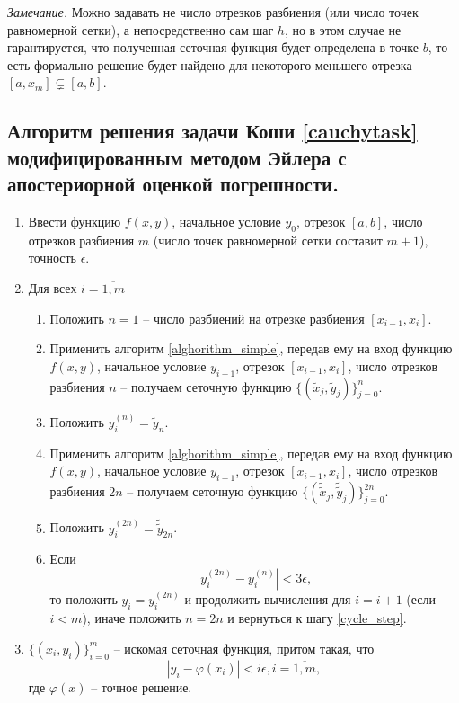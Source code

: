 \documentclass[a4paper, 12pt]{article}
\begin{document}
	\textit{Замечание.} Можно задавать не число отрезков разбиения (или число точек равномерной сетки), а непосредственно сам шаг $h$, но в этом случае не гарантируется, что полученная сеточная функция будет определена в точке $b$, то есть формально решение будет найдено для некоторого меньшего отрезка ${[a,x_m] \varsubsetneq [a,b]}$.
	
	\subsection{Алгоритм решения задачи Коши \eqref{cauchytask} модифицированным методом Эйлера с апостериорной оценкой погрешности.} \label{alghorithm_runge}
	
	\begin{enumerate}
		\item Ввести функцию $f(x,y)$, начальное условие $y_0$, отрезок $[a,b]$, число отрезков разбиения $m$ (число точек равномерной сетки составит $m+1$), точность $\epsilon$.
		\item Для всех $i=\overline{1,m}$
		\begin{enumerate}
			\item Положить $n=1$ -- число разбиений на отрезке разбиения $[x_{i-1},x_i]$.
			\item Применить алгоритм \ref{alghorithm_simple}, передав ему на вход функцию $f(x,y)$, начальное условие $y_{i-1}$, отрезок $[x_{i-1}, x_{i}]$, число отрезков разбиения $n$ -- получаем сеточную функцию $\{(\widetilde{x}_j,\widetilde{y}_j)\}_{j=0}^n$.
			\item Положить $y_i^{(n)}=\widetilde{y}_n$.
			\item Применить алгоритм \ref{alghorithm_simple}, передав ему на вход функцию $f(x,y)$, начальное условие $y_{i-1}$, отрезок $[x_{i-1}, x_{i}]$, число отрезков разбиения $2n$ -- получаем сеточную функцию $\{(\widetilde{\widetilde{x}}_j,\widetilde{\widetilde{y}}_j)\}_{j=0}^{2n}$. \label{cycle_step}
			\item Положить $y_i^{(2n)}=\widetilde{\widetilde{y}}_{2n}$.
			\item Если
			\begin{equation}
				|y_i^{(2n)}-y_i^{(n)}| < 3\epsilon,
			\end{equation}
			то положить $y_i=y_i^{(2n)}$ и продолжить вычисления для $i=i+1$ (если $i<m$), иначе положить $n=2n$ и вернуться к шагу \ref{cycle_step}.
		\end{enumerate}
		\item $\{(x_i,y_i)\}_{i=0}^m$ -- искомая сеточная функция, притом такая, что
		\begin{equation}
			|y_i-\varphi(x_i)|<i\epsilon, i=\overline{1,m},
		\end{equation}
		где $\varphi(x)$ -- точное решение.
	\end{enumerate}
\end{document}
